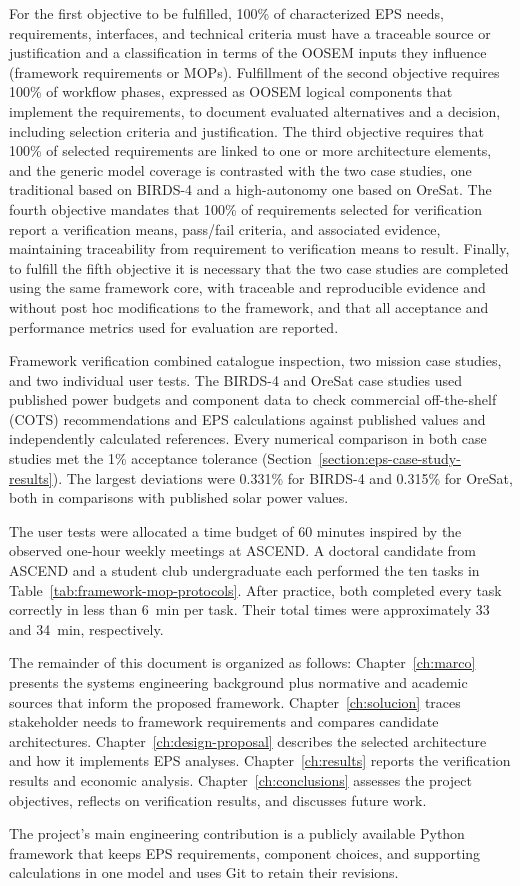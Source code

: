 For the first objective to be fulfilled, 100\% of characterized EPS needs, requirements, interfaces, and technical criteria must have a traceable source or justification and a classification in terms of the OOSEM inputs they influence (framework requirements or MOPs).
Fulfillment of the second objective requires 100\% of workflow phases, expressed as OOSEM logical components that implement the requirements, to document evaluated alternatives and a decision, including selection criteria and justification.
The third objective requires that 100\% of selected requirements are linked to one or more architecture elements, and the generic model coverage is contrasted with the two case studies, one traditional based on BIRDS-4 and a high-autonomy one based on OreSat.
The fourth objective mandates that 100\% of requirements selected for verification report a verification means, pass/fail criteria, and associated evidence, maintaining traceability from requirement to verification means to result.
Finally, to fulfill the fifth objective it is necessary that the two case studies are completed using the same framework core, with traceable and reproducible evidence and without post hoc modifications to the framework, and that all acceptance and performance metrics used for evaluation are reported.

Framework verification combined catalogue inspection, two mission case studies, and two individual user tests.
The BIRDS-4 and OreSat case studies used published power budgets and component data to check commercial off-the-shelf (COTS) recommendations and EPS calculations against published values and independently calculated references.
Every numerical comparison in both case studies met the 1\% acceptance tolerance (Section~\ref{section:eps-case-study-results}). The largest deviations were 0.331\% for BIRDS-4 and 0.315\% for OreSat, both in comparisons with published solar power values.

The user tests were allocated a time budget of 60 minutes inspired by the observed one-hour weekly meetings at ASCEND. A doctoral candidate from ASCEND and a student club undergraduate each performed the ten tasks in Table~\ref{tab:framework-mop-protocols}. After practice, both completed every task correctly in less than 6~min per task. Their total times were approximately 33 and 34~min, respectively.

The remainder of this document is organized as follows: Chapter~\ref{ch:marco} presents the systems engineering background plus normative and academic sources that inform the proposed framework. Chapter~\ref{ch:solucion} traces stakeholder needs to framework requirements and compares candidate architectures. Chapter~\ref{ch:design-proposal} describes the selected architecture and how it implements EPS analyses. Chapter~\ref{ch:results} reports the verification results and economic analysis. Chapter~\ref{ch:conclusions} assesses the project objectives, reflects on verification results, and discusses future work.

The project's main engineering contribution is a publicly available Python framework \cite{repo} that keeps EPS requirements, component choices, and supporting calculations in one model and uses Git to retain their revisions.